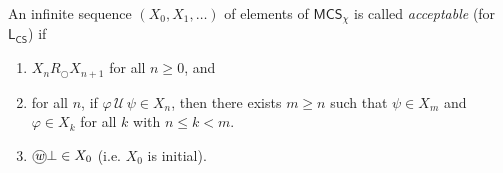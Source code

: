 \documentclass[envcountsect,envcountsame,oribibl,orivec]{llncs}
\newcommand*\circled[1]{\tikz[baseline=(char.base)]{
		\node[shape=circle,draw,inner sep=0.4pt] (char) {#1};}}
\newcommand{\lnext}{\bigcirc}
\newcommand{\luntil}{{\,\mathcal{U}\,}}
\newcommand{\wprevious}{\circled{\textit{w}}}
\newcommand{\CS}{\textsf{CS}}
\renewcommand{\phi}{\varphi}
\newcommand{\MCS}{\mathsf{MCS}}
\begin{document}
\begin{definition}\label{Def:acceptable sequence}
	
	An infinite sequence $(X_0, X_1, \ldots)$ of elements of $\MCS_\chi$ is called \textit{acceptable} (for $\mathsf{L}_\CS$) if 
	\begin{enumerate}
		\item $X_n R_\lnext X_{n+1}$ for all $n \geq 0$, and
		\item for all $n$, if $\phi \luntil \psi \in X_n$, then there exists $m \geq n$ such that $\psi \in X_m$ and $\phi \in X_k$ for all $k$ with $n \leq k <m$.
		\item $\wprevious \bot \in X_0$ (i.e. $X_0$ is initial). 
	\end{enumerate}
\end{definition}
\end{document}
